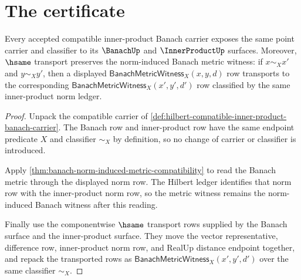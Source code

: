 \section{The certificate}
\label{sec:hilbert-certificate}

\begin{theorem}
\label{thm:hilbert-induced-norm-banach-compatibility}
Every accepted compatible inner-product Banach carrier exposes the same point
carrier and classifier to its $\BanachUp$ and $\InnerProductUp$ surfaces.
Moreover, $\hsame$ transport preserves the norm-induced Banach metric witness:
if $x\sim_X x'$ and $y\sim_X y'$, then a displayed
$\mathsf{BanachMetricWitness}_X(x,y,d)$ row transports to the corresponding
$\mathsf{BanachMetricWitness}_X(x',y',d')$ row classified by the same
inner-product norm ledger.
\end{theorem}
\begin{proof}
Unpack the compatible carrier of
\autoref{def:hilbert-compatible-inner-product-banach-carrier}. The Banach row
and inner-product row have the same endpoint predicate $X$ and classifier
$\sim_X$ by definition, so no change of carrier or classifier is introduced.

Apply \autoref{thm:banach-norm-induced-metric-compatibility} to read the
Banach metric through the displayed norm row. The Hilbert ledger identifies
that norm row with the inner-product norm row, so the metric witness remains
the norm-induced Banach witness after this reading.

Finally use the componentwise $\hsame$ transport rows supplied by the Banach
surface and the inner-product surface. They move the vector representative,
difference row, inner-product norm row, and RealUp distance endpoint together,
and repack the transported rows as
$\mathsf{BanachMetricWitness}_X(x',y',d')$ over the same classifier
$\sim_X$.
\end{proof}

